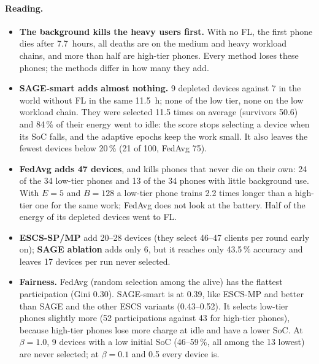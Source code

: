 \documentclass[11pt,a4paper]{article}
\begin{document}
\paragraph{Reading.}
\begin{itemize}
  \item \textbf{The background kills the heavy users first.} With no FL, the
        first phone dies after 7.7~hours, all deaths are on the medium and heavy
        workload chains, and more than half are high-tier phones. Every method
        loses these phones; the methods differ in how many they add.
  \item \textbf{SAGE-smart adds almost nothing.} 9 depleted devices against 7
        in the world without FL in the same 11.5~h; none of the low tier, none on
        the low workload chain. They were selected 11.5 times on average
        (survivors 50.6) and 84\,\% of their energy went to idle: the score
        stops selecting a device when its SoC falls, and the adaptive epochs keep
        the work small. It also leaves the fewest devices below 20\,\% (21 of
        100, FedAvg 75).
  \item \textbf{FedAvg adds 47 devices}, and kills phones that never die on
        their own: 24 of the 34 low-tier phones and 13 of the 34 phones with
        little background use. With $E=5$ and $B=128$ a low-tier phone trains
        2.2 times longer than a high-tier one for the same work; FedAvg does not
        look at the battery. Half of the energy of its depleted devices went to
        FL.
  \item \textbf{ESCS-SP/MP} add 20--28 devices (they select 46--47 clients per
        round early on); \textbf{SAGE ablation} adds only 6, but it reaches
        only 43.5\,\% accuracy and leaves 17 devices per run never selected.
  \item \textbf{Fairness.} FedAvg (random selection among the alive) has the
        flattest participation (Gini 0.30). SAGE-smart is at 0.39, like ESCS-MP
        and better than SAGE and the other ESCS variants (0.43--0.52). It selects
        low-tier phones slightly more (52 participations against 43 for high-tier
        phones), because high-tier phones lose more charge at idle and have a
        lower SoC. At $\beta=1.0$, 9 devices with a low initial SoC
        (46--59\,\%, all among the 13 lowest) are never selected; at $\beta=0.1$ and 0.5 every device is.
\end{itemize}

\end{document}
